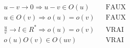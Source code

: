 \begin{align*}
 &u-v \rightarrow 0 \Rightarrow u - v\in O(u) & & \text{FAUX}\\
 &u \in O(v) \Rightarrow o(u) = o(v)  & & \text{FAUX}\\
 &\frac{u}{v}\rightarrow l\in R^* \Rightarrow o(u) = o(v) & & \text{VRAI}\\
 & o(u)  O(v) \in O(uv)  & & \text{VRAI}
\end{align*}
